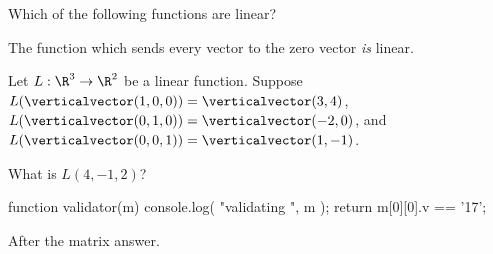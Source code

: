 \documentclass{ximera}
\begin{document}
\begin{question}
  Which of the following functions are linear?
  \begin{solution}
    \begin{multiple-choice}
    \end{multiple-choice}
  \end{solution}

  The function which sends every vector to the zero vector \textit{is} linear.
\end{question}
	
\begin{question}
  Let $L:\R^3 \to \R^2$ be a linear function.  Suppose $L(\verticalvector(1,0,0)) = \verticalvector(3,4)$, 
  $L(\verticalvector(0,1,0)) = \verticalvector(-2,0)$,  and  $L(\verticalvector(0,0,1)) = \verticalvector(1,-1)$.
  
  \begin{solution}
    What is $L (4,-1,2)$?

    \begin{matrix-answer}[name=M]
      function validator(m) {
        console.log( "validating ", m );
        return m[0][0].v == '17';
      }
    \end{matrix-answer}
    
    After the matrix answer.
  \end{solution}
\end{question}
\end{document}
